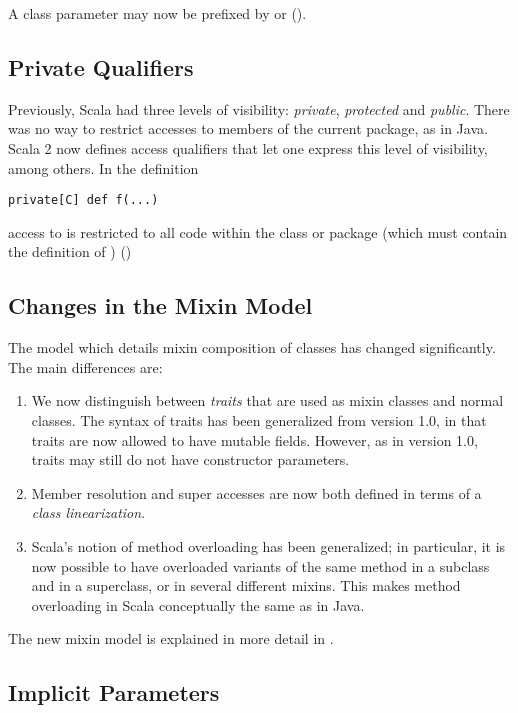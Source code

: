 A class parameter may now be prefixed by \lstinline@val@ or
\lstinline@var@ (). 

\subsection*{Private Qualifiers}

Previously, Scala had three levels of visibility: {\em private},
{\em protected} and {\em public}. There was no way to
restrict accesses to members of the current package, as in Java. Scala
2 now defines access qualifiers that let one express this level of
visibility, among others. In the definition
\begin{lstlisting}
private[C] def f(...)
\end{lstlisting}
access to \lstinline@f@ is restricted to all code within the class or
package \lstinline@C@ (which must contain the definition of
\lstinline@f@) ()

\subsection*{Changes in the Mixin Model}\label{sec:mixin-classes}

The model which details mixin composition of classes has changed
significantly. The main differences are:
\begin{enumerate}
\item
We now distinguish between {\em traits} that are used as mixin classes
and normal classes. The syntax of traits has been generalized from
version 1.0, in that traits are now allowed to have mutable
fields. However, as in version 1.0, traits may still do not have
constructor parameters.
\item
Member resolution and super accesses are now both defined in terms of
a {\em class linearization}. 
\item
Scala's notion of method overloading has been generalized; in
 particular, it is now possible to have overloaded variants of the
 same method in a subclass and in a superclass, or in several different
 mixins. This makes method overloading in Scala conceptually the
 same as in Java.
\end{enumerate}
The new mixin model is explained in more detail in
.

\subsection*{Implicit Parameters}

